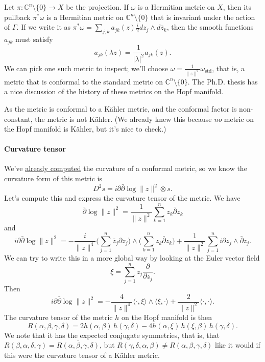 \documentclass[11pt]{article}
\newcommand{\kk}[1]{\mathbb{#1}}
\begin{document}
Let \(\pi : \kk C^n \setminus \{0\} \to X\) be the projection. If \(\omega\) is a Hermitian metric on \(X\), then its pullback \(\pi^*\omega\) is a Hermitian metric on \(\kk C^n \setminus \{0\}\) that is invariant under the action of \(\Gamma\). If we write it as \(\pi^*\omega = \sum_{j,k} a_{jk}(z) \tfrac{i}{2} dz_j \wedge d\bar z_k\), then the smooth functions \(a_{jk}\) must satisfy
$$
a_{jk}(\lambda z) = \frac{1}{|\lambda|^2} a_{jk}(z).
$$
We can pick one such metric to inspect; we'll choose \(\omega = \frac{1}{\|z\|^2} \omega_{\mathrm{std}}\), that is, a metric that is conformal to the standard metric on \(\kk C^n \setminus \{0\}\). The Ph.D. thesis \cite{istrati:tel-02156198} has a nice discussion of the history of these metrics on the Hopf manifold.

As the metric is conformal to a K\"ahler metric, and the conformal factor is non-constant, the metric is not K\"ahler. (We already knew this because \emph{no} metric on the Hopf manifold is K\"ahler, but it's nice to check.)


\paragraph{Curvature tensor}
\label{sec:org96d544d}

We've \hyperref[sec:org65fcbad]{already computed} the curvature of a conformal metric, so we know the curvature form of this metric is
$$
D^2 s = i\partial\bar\partial \log \|z\|^2 \otimes s.
$$
Let's compute this and express the curvature tensor of the metric. We have
$$
\bar\partial \log \|z\|^2
= \frac{1}{\|z\|^2} \sum_{k=1}^n z_k \bar\partial z_k
$$
and
$$
i\partial\bar\partial \log \|z\|^2
= - \frac{i}{\|z\|^4} \biggl(\sum_{j=1}^n \bar z_j \partial z_j \biggr) \wedge \biggl(\sum_{k=1}^n z_k \bar\partial z_k\biggr) + \frac{1}{\|z\|^2} \sum_{j=1}^n i\partial z_j \wedge \bar\partial z_j.
$$
We can try to write this in a more global way by looking at the Euler vector field
$$
\xi = \sum_{j=1}^n z_j \frac{\partial}{\partial z_j}.
$$
Then
$$
i\partial\bar\partial \log \|z\|^2
= -\frac{4}{\|z\|^4} \langle \cdot, \xi \rangle \wedge \langle \xi, \cdot \rangle + \frac{2}{\|z\|^2} \langle \cdot, \cdot \rangle.
$$
The curvature tensor of the metric \(h\) on the Hopf manifold is then
$$
R(\alpha,\beta,\gamma,\delta)
= 2 h(\alpha, \beta)\,h(\gamma, \delta) - 4 h(\alpha, \xi)\, h(\xi, \beta)\,h(\gamma, \delta).
$$
We note that it has the expected conjugate symmetries, that is, that \(R(\beta, \alpha, \delta, \gamma) = \overline{R(\alpha, \beta, \gamma, \delta)}\), but \(R(\gamma, \delta, \alpha, \beta) \not= R(\alpha, \beta, \gamma, \delta)\) like it would if this were the curvature tensor of a K\"ahler metric.
\end{document}
